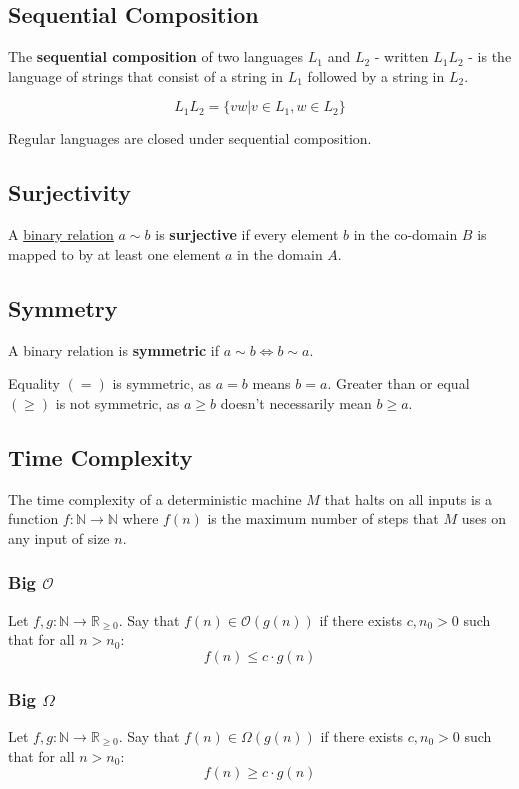 \documentclass{article}
\begin{document}
\subsection{Sequential Composition}\label{sequential-composition}
The \textbf{sequential composition} of two languages $L_1$ and $L_2$ - written $L_1L_2$ - is the language of strings that consist of a string in $L_1$ followed by a string in $L_2$.

\[ L_1L_2=\{vw | v \in L_1, w \in L_2\} \]

Regular languages are closed under sequential composition.


\subsection{Surjectivity}\label{surjective}
A \hyperref[binary-relation]{binary relation} $a \sim b$ is \textbf{surjective} if every element $b$ in the co-domain $B$ is mapped to by at least one element $a$ in the domain $A$.


\subsection{Symmetry}\label{symmetric}
A binary relation is \textbf{symmetric} if $a \sim b \Leftrightarrow b \sim a$.

Equality $(=)$ is symmetric, as $a = b$ means $b = a$. Greater than or equal $(\geq)$ is not symmetric, as $a \geq b$ doesn't necessarily mean $b \geq a$.


\subsection{Time Complexity}\label{time-complexity}
The time complexity of a deterministic machine $M$ that halts on all inputs is a function $f : \mathbb{N} \to \mathbb{N}$ where $f(n)$ is the maximum number of steps that $M$ uses on any input of size $n$.

\subsubsection{Big $\mathcal{O}$}
Let $f, g : \mathbb{N} \to \mathbb{R}_{\geq 0}$. Say that $f(n) \in \mathcal{O}(g(n))$ if there exists $c, n_0 > 0$ such that for all $n > n_0$: 
\[f(n) \leq c \cdot g(n)\]

\subsubsection{Big $\Omega$}
Let $f, g : \mathbb{N} \to \mathbb{R}_{\geq 0}$. Say that $f(n) \in \Omega(g(n))$ if there exists $c, n_0 > 0$ such that for all $n > n_0$:
\[f(n) \geq c \cdot g(n)\]
\end{document}

